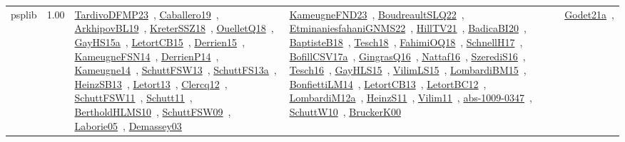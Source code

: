 {\begin{longtable}{p{3cm}r>{\raggedright\arraybackslash}p{6cm}>{\raggedright\arraybackslash}p{6cm}>{\raggedright\arraybackslash}p{8cm}}
\index{psplib}\index{Classification!psplib}psplib &  1.00 & \href{../works/TardivoDFMP23.pdf}{TardivoDFMP23}~\cite{TardivoDFMP23}, \href{../works/Caballero19.pdf}{Caballero19}~\cite{Caballero19}, \href{../works/ArkhipovBL19.pdf}{ArkhipovBL19}~\cite{ArkhipovBL19}, \href{../works/KreterSSZ18.pdf}{KreterSSZ18}~\cite{KreterSSZ18}, \href{../works/OuelletQ18.pdf}{OuelletQ18}~\cite{OuelletQ18}, \href{../works/GayHS15a.pdf}{GayHS15a}~\cite{GayHS15a}, \href{../works/LetortCB15.pdf}{LetortCB15}~\cite{LetortCB15}, \href{../works/Derrien15.pdf}{Derrien15}~\cite{Derrien15}, \href{../works/KameugneFSN14.pdf}{KameugneFSN14}~\cite{KameugneFSN14}, \href{../works/DerrienP14.pdf}{DerrienP14}~\cite{DerrienP14}, \href{../works/Kameugne14.pdf}{Kameugne14}~\cite{Kameugne14}, \href{../works/SchuttFSW13.pdf}{SchuttFSW13}~\cite{SchuttFSW13}, \href{../works/SchuttFS13a.pdf}{SchuttFS13a}~\cite{SchuttFS13a}, \href{../works/HeinzSB13.pdf}{HeinzSB13}~\cite{HeinzSB13}, \href{../works/Letort13.pdf}{Letort13}~\cite{Letort13}, \href{../works/Clercq12.pdf}{Clercq12}~\cite{Clercq12}, \href{../works/SchuttFSW11.pdf}{SchuttFSW11}~\cite{SchuttFSW11}, \href{../works/Schutt11.pdf}{Schutt11}~\cite{Schutt11}, \href{../works/BertholdHLMS10.pdf}{BertholdHLMS10}~\cite{BertholdHLMS10}, \href{../works/SchuttFSW09.pdf}{SchuttFSW09}~\cite{SchuttFSW09}, \href{../works/Laborie05.pdf}{Laborie05}~\cite{Laborie05}, \href{../works/Demassey03.pdf}{Demassey03}~\cite{Demassey03} & \href{../works/KameugneFND23.pdf}{KameugneFND23}~\cite{KameugneFND23}, \href{../works/BoudreaultSLQ22.pdf}{BoudreaultSLQ22}~\cite{BoudreaultSLQ22}, \href{../works/EtminaniesfahaniGNMS22.pdf}{EtminaniesfahaniGNMS22}~\cite{EtminaniesfahaniGNMS22}, \href{../works/HillTV21.pdf}{HillTV21}~\cite{HillTV21}, \href{../works/BadicaBI20.pdf}{BadicaBI20}~\cite{BadicaBI20}, \href{../works/BaptisteB18.pdf}{BaptisteB18}~\cite{BaptisteB18}, \href{../works/Tesch18.pdf}{Tesch18}~\cite{Tesch18}, \href{../works/FahimiOQ18.pdf}{FahimiOQ18}~\cite{FahimiOQ18}, \href{../works/SchnellH17.pdf}{SchnellH17}~\cite{SchnellH17}, \href{../works/BofillCSV17a.pdf}{BofillCSV17a}~\cite{BofillCSV17a}, \href{../works/GingrasQ16.pdf}{GingrasQ16}~\cite{GingrasQ16}, \href{../works/Nattaf16.pdf}{Nattaf16}~\cite{Nattaf16}, \href{../works/SzerediS16.pdf}{SzerediS16}~\cite{SzerediS16}, \href{../works/Tesch16.pdf}{Tesch16}~\cite{Tesch16}, \href{../works/GayHLS15.pdf}{GayHLS15}~\cite{GayHLS15}, \href{../works/VilimLS15.pdf}{VilimLS15}~\cite{VilimLS15}, \href{../works/LombardiBM15.pdf}{LombardiBM15}~\cite{LombardiBM15}, \href{../works/BonfiettiLM14.pdf}{BonfiettiLM14}~\cite{BonfiettiLM14}, \href{../works/LetortCB13.pdf}{LetortCB13}~\cite{LetortCB13}, \href{../works/LetortBC12.pdf}{LetortBC12}~\cite{LetortBC12}, \href{../works/LombardiM12a.pdf}{LombardiM12a}~\cite{LombardiM12a}, \href{../works/HeinzS11.pdf}{HeinzS11}~\cite{HeinzS11}, \href{../works/Vilim11.pdf}{Vilim11}~\cite{Vilim11}, \href{../works/abs-1009-0347.pdf}{abs-1009-0347}~\cite{abs-1009-0347}, \href{../works/SchuttW10.pdf}{SchuttW10}~\cite{SchuttW10}, \href{../works/BruckerK00.pdf}{BruckerK00}~\cite{BruckerK00} & \href{../works/Godet21a.pdf}{Godet21a}~\cite{Godet21a}, 
\end{longtable}}
